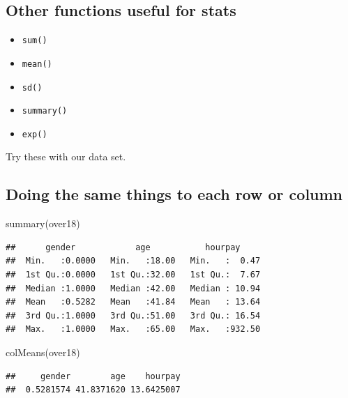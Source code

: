 \documentclass[
]{gitbook}
\newenvironment{Shaded}{\begin{snugshade}}{\end{snugshade}}
\newcommand{\FunctionTok}[1]{\textcolor[rgb]{0.00,0.00,0.00}{#1}}
\newcommand{\NormalTok}[1]{#1}
\providecommand{\tightlist}{%
  \setlength{\itemsep}{0pt}\setlength{\parskip}{0pt}}
\begin{document}
\hypertarget{other-functions-useful-for-stats}{%
\subsection{Other functions useful for stats}\label{other-functions-useful-for-stats}}

\begin{itemize}
\tightlist
\item
  \texttt{sum()}
\item
  \texttt{mean()}
\item
  \texttt{sd()}
\item
  \texttt{summary()}
\item
  \texttt{exp()}
\end{itemize}

Try these with our data set.

\hypertarget{doing-the-same-things-to-each-row-or-column}{%
\subsection{Doing the same things to each row or column}\label{doing-the-same-things-to-each-row-or-column}}

\footnotesize

\begin{Shaded}
\begin{Highlighting}[]
\FunctionTok{summary}\NormalTok{(over18)}
\end{Highlighting}
\end{Shaded}

\begin{verbatim}
##      gender            age           hourpay      
##  Min.   :0.0000   Min.   :18.00   Min.   :  0.47  
##  1st Qu.:0.0000   1st Qu.:32.00   1st Qu.:  7.67  
##  Median :1.0000   Median :42.00   Median : 10.94  
##  Mean   :0.5282   Mean   :41.84   Mean   : 13.64  
##  3rd Qu.:1.0000   3rd Qu.:51.00   3rd Qu.: 16.54  
##  Max.   :1.0000   Max.   :65.00   Max.   :932.50
\end{verbatim}

\begin{Shaded}
\begin{Highlighting}[]
\FunctionTok{colMeans}\NormalTok{(over18)}
\end{Highlighting}
\end{Shaded}

\begin{verbatim}
##     gender        age    hourpay 
##  0.5281574 41.8371620 13.6425007
\end{verbatim}
\end{document}
